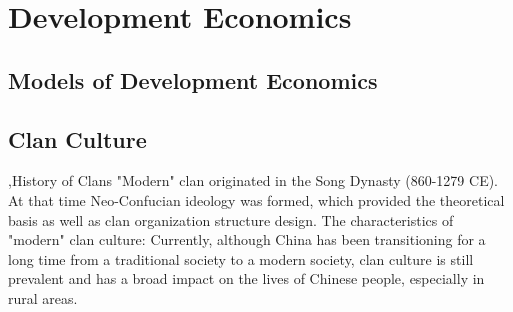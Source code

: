 \documentclass[10pt]{report}
\begin{document}
\clearpage
\section{Development Economics}

\subsection{Models of Development Economics}

\subsection{Clan Culture}

\sep{History of Clans}
"Modern" clan originated in the Song Dynasty (860-1279 CE). At that time Neo-Confucian ideology was formed,
which provided the theoretical basis as well as clan organization structure design. The characteristics
of "modern" clan culture:
Currently, although China has been transitioning for a long time from a traditional society to a modern society, clan culture is still
prevalent and has a broad impact on the lives of Chinese people, especially in rural areas.
\end{document}
